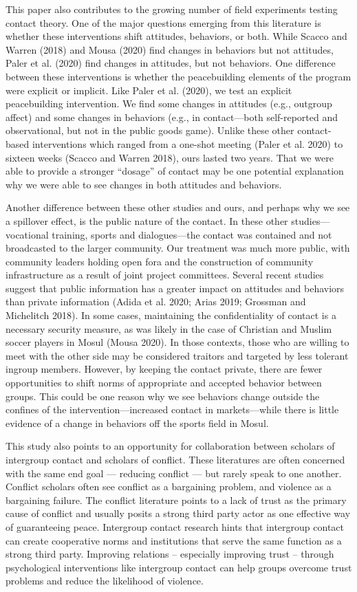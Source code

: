 \documentclass[11pt]{article}
\begin{document}
This paper also contributes to the growing number of field experiments
testing contact theory. One of the major questions emerging from this
literature is whether these interventions shift attitudes, behaviors, or
both. While Scacco and Warren (2018) and Mousa (2020) find changes in
behaviors but not attitudes, Paler et al. (2020) find changes in
attitudes, but not behaviors. One difference between these interventions
is whether the peacebuilding elements of the program were explicit or
implicit. Like Paler et al. (2020), we test an explicit peacebuilding
intervention. We find some changes in attitudes (e.g., outgroup affect)
and some changes in behaviors (e.g., in contact---both self-reported and
observational, but not in the public goods game). Unlike these other
contact-based interventions which ranged from a one-shot meeting (Paler
et al. 2020) to sixteen weeks (Scacco and Warren 2018), ours lasted two
years. That we were able to provide a stronger ``dosage'' of contact may
be one potential explanation why we were able to see changes in both
attitudes and behaviors.

Another difference between these other studies and ours, and perhaps why
we see a spillover effect, is the public nature of the contact. In these
other studies---vocational training, sports and dialogues---the contact
was contained and not broadcasted to the larger community. Our treatment
was much more public, with community leaders holding open fora and the
construction of community infrastructure as a result of joint project
committees. Several recent studies suggest that public information has a
greater impact on attitudes and behaviors than private information
(Adida et al. 2020; Arias 2019; Grossman and Michelitch 2018). In some
cases, maintaining the confidentiality of contact is a necessary
security measure, as was likely in the case of Christian and Muslim
soccer players in Mosul (Mousa 2020). In those contexts, those who are
willing to meet with the other side may be considered traitors and
targeted by less tolerant ingroup members. However, by keeping the
contact private, there are fewer opportunities to shift norms of
appropriate and accepted behavior between groups. This could be one
reason why we see behaviors change outside the confines of the
intervention---increased contact in markets---while there is little
evidence of a change in behaviors off the sports field in Mosul.

This study also points to an opportunity for collaboration between
scholars of intergroup contact and scholars of conflict. These
literatures are often concerned with the same end goal --- reducing
conflict --- but rarely speak to one another. Conflict scholars often
see conflict as a bargaining problem, and violence as a bargaining
failure. The conflict literature points to a lack of trust as the
primary cause of conflict and usually posits a strong third party actor
as one effective way of guaranteeing peace. Intergroup contact research
hints that intergroup contact can create cooperative norms and
institutions that serve the same function as a strong third party.
Improving relations -- especially improving trust -- through
psychological interventions like intergroup contact can help groups
overcome trust problems and reduce the likelihood of violence.
\end{document}
